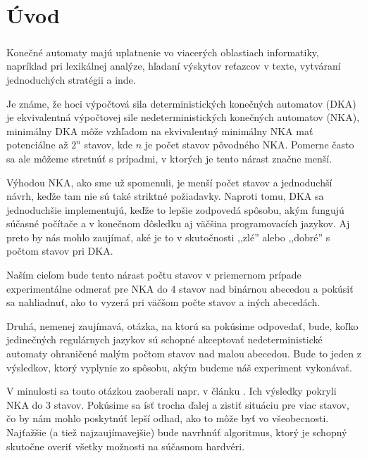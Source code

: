\chapter*{Úvod}
\paragraph{}


Konečné automaty majú uplatnenie vo viacerých oblastiach informatiky, napríklad pri lexikálnej analýze, hľadaní výskytov reťazcov v texte, vytváraní jednoduchých stratégii a inde.

Je známe, že hoci výpočtová sila deterministických konečných automatov (DKA) je ekvivalentná výpočtovej sile nedeterministických konečných automatov (NKA), minimálny DKA môže vzhľadom na ekvivalentný minimálny NKA mať potenciálne až $2^n$ stavov, kde $n$ je počet stavov pôvodného NKA. Pomerne často sa ale môžeme stretnúť s prípadmi, v ktorých je tento nárast značne menší.

Výhodou NKA, ako sme už spomenuli, je menší počet stavov a jednoduchší návrh, keďže tam nie sú také striktné požiadavky. Naproti tomu, DKA sa jednoduchšie implementujú, keďže to lepšie zodpovedá spôsobu, akým fungujú súčasné počítače a v konečnom dôsledku aj väčšina programovacích jazykov. Aj preto by nás mohlo zaujímať, aké je to v skutočnosti ,,zlé'' alebo ,,dobré'' s počtom stavov pri DKA. 

Naším cieľom bude tento nárast počtu stavov v priemernom prípade experimentálne odmerať pre NKA do 4 stavov nad binárnou abecedou a pokúsiť sa nahliadnuť, ako to vyzerá pri väčšom počte stavov a iných abecedách.

Druhá, nemenej zaujímavá, otázka, na ktorú sa pokúsime odpovedať, bude, koľko jedinečných regulárnych jazykov sú schopné akceptovať nedeterministické automaty ohraničené malým počtom stavov nad malou abecedou. Bude to jeden z výsledkov, ktorý vyplynie zo spôsobu, akým budeme náš experiment vykonávať.

V minulosti sa touto otázkou zaoberali napr. v článku \cite{shallit}. Ich výsledky pokryli NKA do 3 stavov. Pokúsime sa ísť trocha ďalej a zistiť situáciu pre viac stavov, čo by nám mohlo poskytnúť lepší odhad, ako to môže byť vo všeobecnosti. Najťažšie (a tiež najzaujímavejšie) bude navrhnúť algoritmus, ktorý je schopný skutočne overiť všetky možnosti na súčasnom hardvéri.
